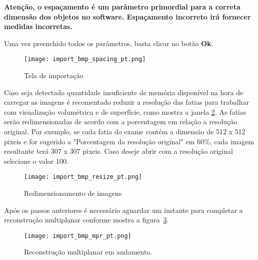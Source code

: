 \textbf{Atenção, o espaçamento é um parâmetro primordial para a correta dimensão dos objetos no software. Espaçamento incorreto irá fornecer medidas incorretas.}

Uma vez preenchido todos os parâmetros, basta clicar no botão \textbf{Ok}.

\begin{figure}[!htb]
\centering
\texttt{[image: import\_bmp\_spacing\_pt.png]}
\caption{Tela de importação}
\label{fig:import_bmp_spacing_pt}
\end{figure}

Caso seja detectado quantidade insuficiente de memória disponível na hora de carregar as imagens é recomentado  reduzir a resolução das fatias para trabalhar com visualização volumétrica e de superfície, como mostra a janela \ref{fig:import_bmp_resize_pt}.  As fatias serão redimensionadas de acordo com a porcentagem em relação a resolução original. Por exemplo,  se cada fatia do exame contém a dimensão de 512 x 512 pixeis e for sugerido a "Porcentagem da resolução original" em 60\%, cada imagem resultante terá 307 x 307 pixeis. Caso deseje abrir com a resolução original selecione o valor 100.

\begin{figure}[!htb]
\centering
\texttt{[image: import\_bmp\_resize\_pt.png]}
\caption{Redimensionamento de imagens}
\label{fig:import_bmp_resize_pt}
\end{figure}

Após os passos anteriores é necessário aguardar um instante para completar a reconstrução multiplanar conforme mostra a figura~\ref{fig:import_bmp_mpr_pt.png}.

\begin{figure}[!htb]
\centering
\texttt{[image: import\_bmp\_mpr\_pt.png]}
\caption{Reconstrução multiplanar em andamento.}
\label{fig:import_bmp_mpr_pt.png}
\end{figure}